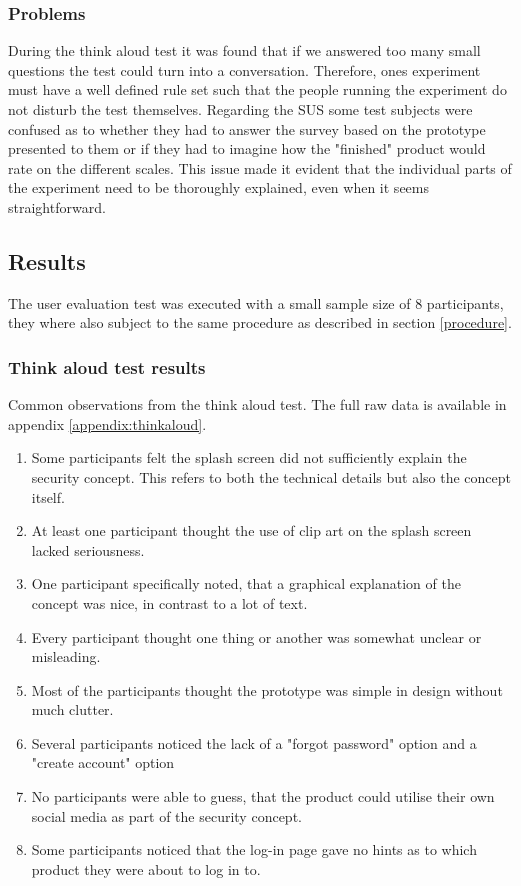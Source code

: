 \subsubsection{Problems}
During the think aloud test it was found that if we answered too many small questions the test could turn into a conversation. Therefore, ones experiment must have a well defined rule set such that the people running the experiment do not disturb the test themselves.\newline
Regarding the SUS some test subjects were confused as to whether they had to answer the survey based on the prototype presented to them or if they had to imagine how the "finished" product would rate on the different scales. This issue made it evident that the individual parts of the experiment need to be thoroughly explained, even when it seems straightforward.

\subsection{Results}
The user evaluation test was executed with a small sample size of 8 participants, they where also subject to the same procedure as described in section \ref{procedure}.

\subsubsection{Think aloud test results}
Common observations from the think aloud test. The full raw data is available in appendix \ref{appendix:thinkaloud}.
\begin{enumerate}
    \item Some participants felt the splash screen did not sufficiently explain the security concept. This refers to both the technical details but also the concept itself. 
    \item At least one participant thought the use of clip art on the splash screen lacked seriousness.
    \item One participant specifically noted, that a graphical explanation of the concept was nice, in contrast to a lot of text.
    \item Every participant thought one thing or another was somewhat unclear or misleading.
    \item Most of the participants thought the prototype was simple in design without much clutter.
    \item Several participants noticed the lack of a "forgot password" option and a "create account" option
    \item No participants were able to guess, that the product could utilise their own social media as part of the security concept.
    \item Some participants noticed that the log-in page gave no hints as to which product they were about to log in to. 
\end{enumerate}


